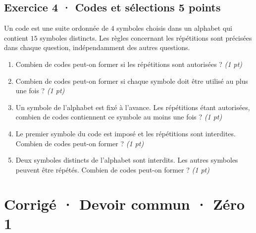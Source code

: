 \subsection*{Exercice 4 · Codes et sélections \hfill 5 points}Un code est une suite ordonnée de $4$ symboles choisis dans un alphabet qui contient $15$ symboles distincts. Les règles concernant les répétitions sont précisées dans chaque question, indépendamment des autres questions.

\begin{enumerate}

\item Combien de codes peut-on former si les répétitions sont autorisées ? \hfill\textit{(1 pt)}

\item Combien de codes peut-on former si chaque symbole doit être utilisé au plus une fois ? \hfill\textit{(1 pt)}

\item Un symbole de l'alphabet est fixé à l'avance. Les répétitions étant autorisées, combien de codes contiennent ce symbole au moins une fois ? \hfill\textit{(1 pt)}

\item Le premier symbole du code est imposé et les répétitions sont interdites. Combien de codes peut-on former ? \hfill\textit{(1 pt)}

\item Deux symboles distincts de l'alphabet sont interdits. Les autres symboles peuvent être répétés. Combien de codes peut-on former ? \hfill\textit{(1 pt)}

\end{enumerate}

\ifmxteacher\mxnewpage

\section*{Corrigé · Devoir commun · Zéro 1}\label{cor:3-1}

